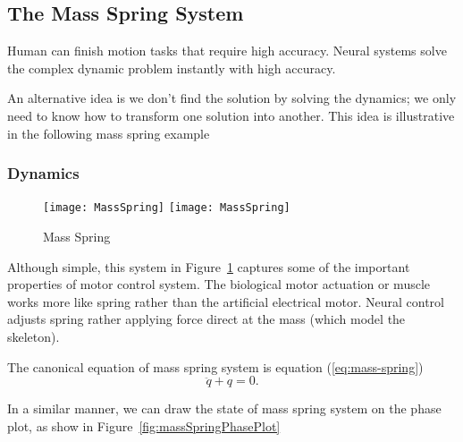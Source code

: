 \subsection{The Mass Spring System}
Human can finish motion tasks that require high accuracy.
Neural systems solve the complex dynamic problem instantly with high accuracy.

An alternative idea is we don’t find the solution by solving the dynamics; we only need to know how to transform one solution into another.
This idea is illustrative in the following mass spring example

\subsubsection*{Dynamics}

\begin{figure}[!htbp]
  \begin{center}
    \leavevmode
    \ifpdf
      \texttt{[image: MassSpring]}
    \else
      \texttt{[image: MassSpring]}
    \fi
    \caption{Mass Spring}
    \label{fig:massspring}
  \end{center}
\end{figure}
Although simple, this system in Figure~\ref{fig:massspring} captures some of the important properties of motor control system.
The biological motor actuation or muscle works more like spring rather than the artificial electrical motor. 
Neural control adjusts spring rather applying force direct at the mass (which model the skeleton).


The canonical equation of mass spring system is equation (\ref{eq:mass-spring})
\begin{equation}
\label{eq:mass-spring}
\ddot{q}+q=0.
\end{equation}

In a similar manner, we can draw the state of mass spring system on the phase plot, as show in Figure~\ref{fig:massSpringPhasePlot}


